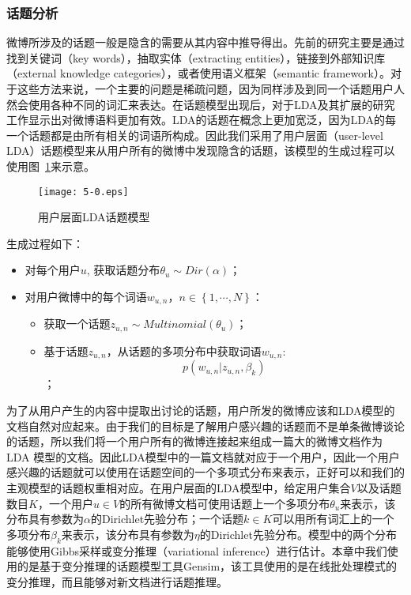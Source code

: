 \subsubsection{话题分析}
\label{topic}
微博所涉及的话题一般是隐含的需要从其内容中推导得出。先前的研究主要是通过找到关键词（key words），抽取实体（extracting  entities），链接到外部知识库（external knowledge categories），或者使用语义框架（semantic framework）。对于这些方法来说，一个主要的问题是稀疏问题，因为同样涉及到同一个话题用户人然会使用各种不同的词汇来表达。在话题模型出现后，对于LDA及其扩展的研究工作显示出对微博语料更加有效。LDA的话题在概念上更加宽泛，因为LDA的每一个话题都是由所有相关的词语所构成。因此我们采用了用户层面（user-level LDA）话题模型来从用户所有的微博中发现隐含的话题，该模型的生成过程可以使用图~\ref{fig5-1}来示意。

\begin{figure}[htb]
\centering
\texttt{[image: 5-0.eps]}
\caption{用户层面LDA话题模型}
\label{fig5-1}
\end{figure}

生成过程如下：
\begin{itemize}
\item 对每个用户$ u $, 获取话题分布$ \theta_{u} \sim Dir \left(  \alpha \right) $；
\item 对用户微博中的每个词语$ w_{u,n} $，$ n \in \left\lbrace 1, \cdots, N \right\rbrace $：
\begin{itemize}
\item 获取一个话题$ z_{u,n} \sim Multinomial \left( \theta_{u}  \right) $；
\item 基于话题$ z_{u,n} $，从话题的多项分布中获取词语$ w_{u,n} $:\\ 
$$  p \left( w_{u,n} \vert z_{u,n}, \beta_{k}  \right) $$；
\end{itemize}
\end{itemize}

为了从用户产生的内容中提取出讨论的话题，用户所发的微博应该和LDA模型的文档自然对应起来。由于我们的目标是了解用户感兴趣的话题而不是单条微博谈论的话题，所以我们将一个用户所有的微博连接起来组成一篇大的微博文档作为LDA 模型的文档。因此LDA模型中的一篇文档就对应于一个用户，因此一个用户感兴趣的话题就可以使用在话题空间的一个多项式分布来表示，正好可以和我们的主观模型的话题权重相对应。在用户层面的LDA模型中，给定用户集合$ V $以及话题数目$ K $，一个用户$ u \in V $的所有微博文档可使用话题上一个多项分布$ \theta_{u} $来表示，该分布具有参数为$ \alpha $的Dirichlet先验分布；一个话题$ k \in K $可以用所有词汇上的一个多项分布$ \beta_{k} $来表示，该分布具有参数为$ \eta $的Dirichlet先验分布。模型中的两个分布能够使用Gibbs采样或变分推理（variational inference）进行估计。本章中我们使用的是基于变分推理的话题模型工具Gensim，该工具使用的是在线批处理模式的变分推理，而且能够对新文档进行话题推理。\cite{mei2007topic,lin2009joint}

